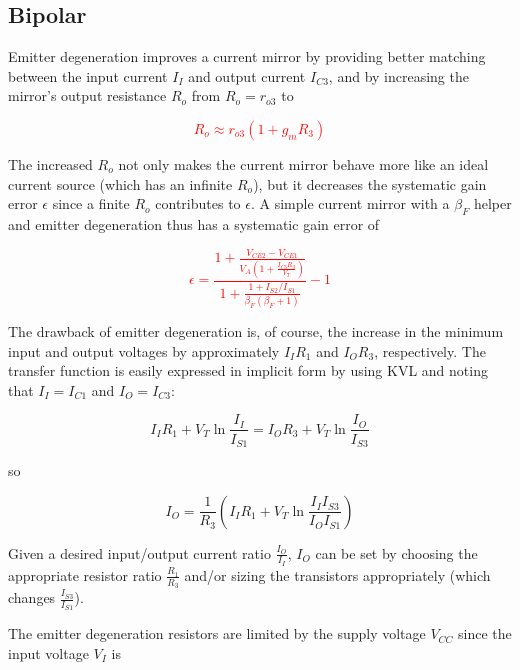 \subsection{Bipolar}
Emitter degeneration improves a current mirror by providing better matching between the input current $I_{I}$ and output current $I_{C3}$, and by increasing the mirror's output resistance $R_{o}$ from $R_{o} = r_{o3}$ to

\textcolor{red}{
\begin{equation}
R_{o} \approx r_{o3}(1+g_{m}R_{3})
\end{equation}
}

The increased $R_{o}$ not only makes the current mirror behave more like an ideal current source (which has an infinite $R_{o}$), but it decreases the systematic gain error $\epsilon$ since a finite $R_{o}$ contributes to $\epsilon$. A simple current mirror with a $\beta_{F}$ helper and emitter degeneration thus has a systematic gain error of

\textcolor{red}{
\begin{equation}
\epsilon = \frac{1+\frac{V_{CE2}-V_{CE1}}{V_{A}(1+\frac{I_{C3}R_{3}}{V_{T}})}}{1+\frac{1+I_{S2}/I_{S1}}{\beta_{F}(\beta_{F}+1)}}-1
\end{equation}
}

The drawback of emitter degeneration is, of course, the increase in the minimum input and output voltages by approximately $I_{I}R_{1}$ and $I_{O}R_{3}$, respectively.
The transfer function is easily expressed in implicit form by using KVL and noting that $I_{I} = I_{C1}$ and $I_{O} = I_{C3}$:

\begin{equation}
I_{I}R_{1}+V_{T}\ln\frac{I_{I}}{I_{S1}} = I_{O}R_{3}+V_{T}\ln\frac{I_{O}}{I_{S3}}
\end{equation}

so

\begin{equation}
I_{O} = \frac{1}{R_{3}}\left(I_{I}R_{1} + V_{T}\ln\frac{I_{I}I_{S3}}{I_{O}I_{S1}}\right)
\end{equation}

Given a desired input/output current ratio $\frac{I_{O}}{I_{I}}$, $I_{O}$ can be set by choosing the appropriate resistor ratio $\frac{R_{1}}{R_{3}}$ and/or sizing the transistors appropriately (which changes $\frac{I_{S3}}{I_{S1}}$).
\par The emitter degeneration resistors are limited by the supply voltage $V_{CC}$ since the input voltage $V_{I}$ is

